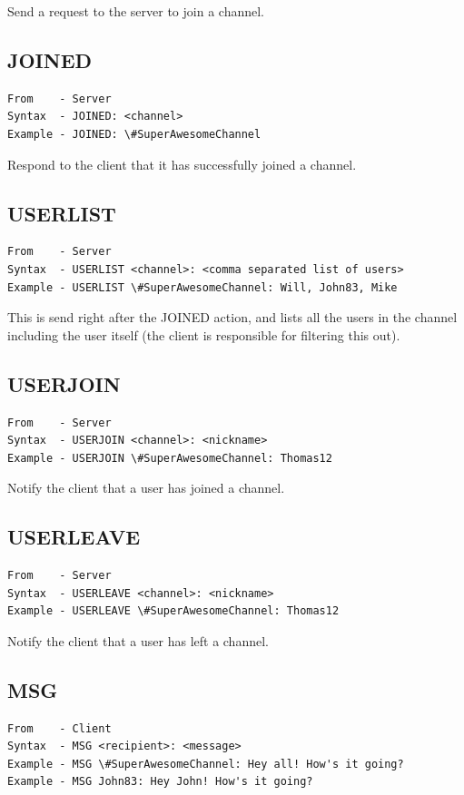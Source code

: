 \documentclass[12pt]{rapport}
\begin{document}
\noindent Send a request to the server to join a channel.

\subsection*{JOINED}
\begin{verbatim}
From    - Server
Syntax  - JOINED: <channel>
Example - JOINED: \#SuperAwesomeChannel
\end{verbatim}

\noindent Respond to the client that it has successfully joined a channel.

\subsection*{USERLIST}
\begin{verbatim}
From    - Server
Syntax  - USERLIST <channel>: <comma separated list of users>
Example - USERLIST \#SuperAwesomeChannel: Will, John83, Mike
\end{verbatim}

\noindent This is send right after the JOINED action, and lists all
the users in the channel including the user itself (the client is
responsible for filtering this out).

\subsection*{USERJOIN}
\begin{verbatim}
From    - Server
Syntax  - USERJOIN <channel>: <nickname>
Example - USERJOIN \#SuperAwesomeChannel: Thomas12
\end{verbatim}

\noindent Notify the client that a user has joined a channel.

\subsection*{USERLEAVE}
\begin{verbatim}
From    - Server
Syntax  - USERLEAVE <channel>: <nickname>
Example - USERLEAVE \#SuperAwesomeChannel: Thomas12
\end{verbatim}

\noindent Notify the client that a user has left a channel.

\subsection*{MSG}
\begin{verbatim}
From    - Client
Syntax  - MSG <recipient>: <message>
Example - MSG \#SuperAwesomeChannel: Hey all! How's it going?
Example - MSG John83: Hey John! How's it going?
\end{verbatim}
\end{document}
